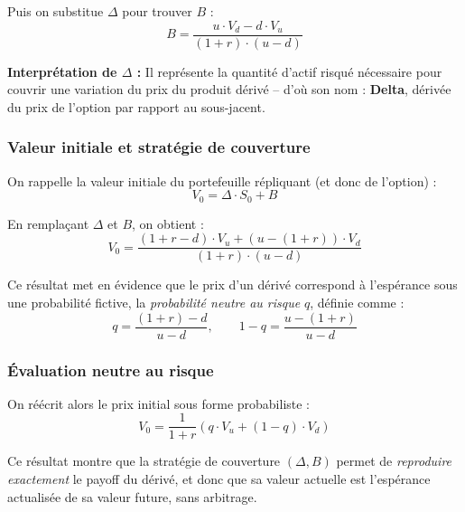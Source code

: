 \documentclass[12pt,a4paper]{article}
\begin{document}
Puis on substitue \(\Delta\) pour trouver \(B\) :
\begin{equation}
\boxed{B = \frac{u \cdot V_d - d \cdot V_u}{(1 + r) \cdot (u - d)}}
\end{equation}

\noindent \textbf{Interprétation de \(\Delta\) :} Il représente la quantité d’actif risqué nécessaire pour couvrir une variation du prix du produit dérivé -- d’où son nom : \textbf{Delta}, dérivée du prix de l’option par rapport au sous-jacent.

\subsubsection{Valeur initiale et stratégie de couverture}

On rappelle la valeur initiale du portefeuille répliquant (et donc de l’option) :
\[
V_0 = \Delta \cdot S_0 + B
\]

En remplaçant \(\Delta\) et \(B\), on obtient :
\[
V_0 = \frac{(1 + r - d) \cdot V_u + (u - (1 + r)) \cdot V_d}{(1 + r) \cdot (u - d)}
\]

Ce résultat met en évidence que le prix d’un dérivé correspond à l’espérance sous une probabilité fictive, la \textit{probabilité neutre au risque} \(q\), définie comme :
\begin{equation}
\boxed{q = \frac{(1 + r) - d}{u - d}, \qquad 1 - q = \frac{u - (1 + r)}{u - d}}
\end{equation}

\subsubsection{Évaluation neutre au risque}

On réécrit alors le prix initial sous forme probabiliste :
\begin{equation}
\boxed{V_0 = \frac{1}{1 + r} \left( q \cdot V_u + (1 - q) \cdot V_d \right)}
\label{eq:prix_option}
\end{equation}

Ce résultat montre que la stratégie de couverture \((\Delta, B)\) permet de \textit{reproduire exactement} le payoff du dérivé, et donc que sa valeur actuelle est l’espérance actualisée de sa valeur future, sans arbitrage.

\begin{flushright}
\end{flushright}
\end{document}
